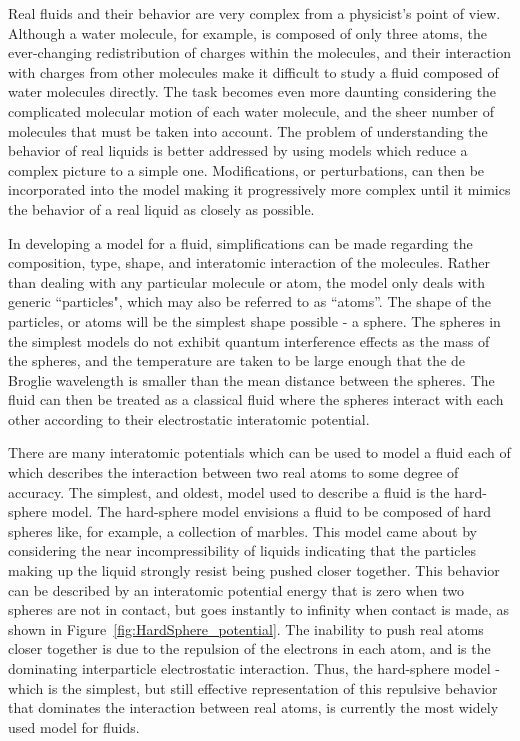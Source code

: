 \documentclass[double,12pt]{beavtex}
\begin{document}
Real fluids and their behavior are very complex from a physicist's point 
of view. Although a water molecule, for example, is composed of only three
atoms, the ever-changing redistribution of charges within the molecules, 
and their interaction with charges from other molecules make it difficult 
to study a fluid composed of water molecules directly. The task becomes 
even more daunting considering the complicated molecular motion of each 
water molecule, and the sheer number of molecules that must be taken 
into account. 
The problem of understanding the behavior of real liquids is better addressed 
by using models which reduce a complex picture to a simple one. Modifications, 
or perturbations, can then be incorporated into the model making it 
progressively more complex until it mimics the behavior of a real 
liquid as closely as possible.

In developing a model for a fluid, simplifications can be made regarding 
the composition, type, shape, and interatomic interaction of the molecules. 
Rather than dealing with any particular molecule or atom, the model only 
deals with generic ``particles", which may also be referred to as ``atoms''. 
The shape of the particles, or atoms will be the simplest shape possible - 
a sphere. The spheres in the simplest models do not exhibit quantum 
interference effects as the mass of the spheres, and the temperature 
are taken to be large enough that the de Broglie wavelength is smaller 
than the mean distance between the spheres. The fluid can then be treated 
as a classical fluid where the spheres interact with each other according 
to their electrostatic interatomic potential. 

There are many interatomic potentials which can be used to model a fluid 
each of which describes the interaction between two real atoms to some 
degree of accuracy. The simplest, and oldest, model used to describe a 
fluid is the hard-sphere model. The hard-sphere model envisions a fluid 
to be composed of hard spheres like, for example, a collection of marbles. 
This model came about by considering the near incompressibility of liquids 
indicating that the particles making up the liquid strongly resist being 
pushed closer together. This behavior can be described by an interatomic 
potential energy that is zero when two spheres are not in contact, but 
goes instantly to infinity when contact is made, as shown in 
Figure~\ref{fig:HardSphere_potential}. The inability to push 
real atoms closer together is due to the repulsion of the electrons in 
each atom, and is the dominating interparticle electrostatic interaction. 
Thus, the hard-sphere model - which is the simplest, but still effective 
representation of this repulsive behavior that dominates the interaction 
between real atoms, is currently the most widely used model for fluids.
\end{document}
